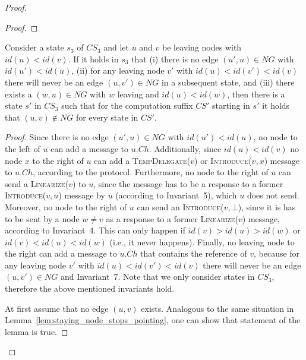 \documentclass[a4paper,USenglish]{lipics}
\newcommand{\linearize}[1]{\textsc{Linearize(\ensuremath{#1})}\xspace}
\newcommand{\introduce}[1]{\textsc{Introduce(\ensuremath{#1})}\xspace}
\newcommand{\tempdelegate}[1]{\textsc{TempDelegate(\ensuremath{#1})}\xspace}
\begin{document}
\begin{proof}
\begin{proof}
\end{proof}

\begin{lemma}
\label{lem:leaving_node_stops_pointing}
Consider a state $s_3$ of $CS_3$ and let $u$ and $v$ be leaving nodes with $id(u)<id(v)$.
If it holds in $s_3$ that (i) there is no edge $(u',u) \in NG$ with $id(u')<id(u)$, (ii) for any leaving node $v'$ with $id(u)<id(v')<id(v)$ there will never be an edge $(u,v') \in NG$ in a subsequent state, and (iii) there exists a $(w,u) \in NG$ with $w$ leaving and $id(u)<id(w)$,
then there is a state $s'$ in $CS_3$ such that for the computation suffix $CS'$ starting in $s'$ it holds that $(u,v) \notin NG$ for every state in $CS'$.
\end{lemma}

\begin{proof}
Since there is no edge $(u',u) \in NG$ with $id(u')<id(u)$, no node to the left of $u$ can add a message to $u.Ch$.
Additionally, since $id(u)<id(v)$ no node $x$ to the right of $u$ can add a \tempdelegate{v} or \introduce{v,x} message to $u.Ch$, according to the protocol.
Furthermore, no node to the right of $u$ can send a \linearize{v} to $u$, since the message has to be a response to a former \introduce{v,u} message by $u$ (according to Invariant~5), which $u$ does not send.
Moreover, no node to the right of $u$ can send an \introduce{v,\bot}, since it is has to be sent by a node $w\neq v$ as a response to a former \linearize{v} message, according to Invariant~4.
This can only happen if $id(v)>id(u)>id(w)$ or $id(v)<id(u)<id(w)$ (i.e., it never happens).
Finally, no leaving node to the right can add a message to $u.Ch$ that contains the reference of $v$, because for any leaving node $v'$ with $id(u)<id(v')<id(v)$ there will never be an edge $(u,v') \in NG$ and Invariant~7.
Note that we only consider states in $CS_3$, therefore the above mentioned invariants hold.

At first assume that no edge $(u,v)$ exists.
Analogous to the same situation in Lemma~\ref{lem:staying_node_stops_pointing}, one can show that statement of the lemma is true.


\end{proof}
\end{proof}
\end{document}
